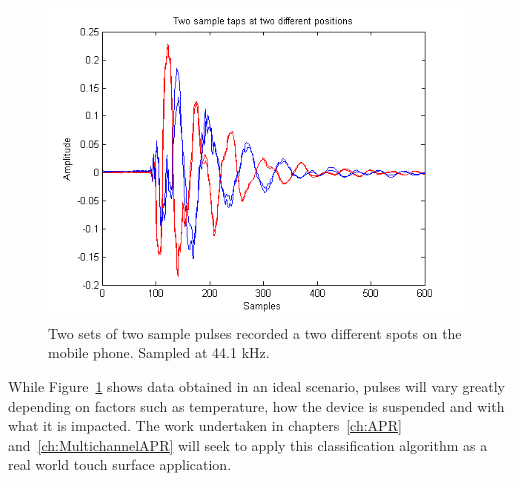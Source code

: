 \begin{figure}
  \begin{center}
    \includegraphics[width=110mm]{twotwoSampleTap.png}
    \caption{Two sets of two sample pulses recorded a two different spots on the mobile phone. Sampled at 44.1 kHz.}\label{fig:twotwoSampleTap.png}
  \end{center}
\end{figure}

While Figure~\ref{fig:twotwoSampleTap.png} shows data obtained in an ideal scenario, pulses will vary greatly depending on factors such as temperature, how the device is suspended and with what it is impacted. The work undertaken in chapters~\ref{ch:APR} and~\ref{ch:MultichannelAPR} will seek to apply this classification algorithm as a real world touch surface application.


